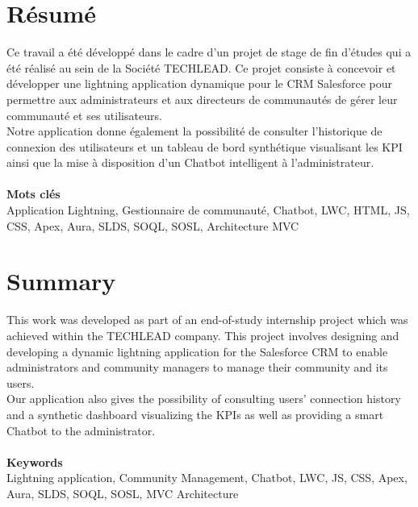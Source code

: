 
\chapter*{Résumé}
\thispagestyle{empty}
\begingroup
\centering


Ce travail a été développé dans le cadre d'un projet de stage de fin d'études qui a été réalisé au sein de la
Société TECHLEAD.
Ce projet consiste à concevoir et développer une lightning application dynamique pour le CRM Salesforce
pour permettre aux administrateurs et aux directeurs de communautés de gérer leur communauté et ses utilisateurs.\\
Notre application donne également
la possibilité de consulter l'historique de connexion des utilisateurs et un tableau de bord synthétique visualisant les KPI ainsi que la mise à disposition d'un Chatbot intelligent à l'administrateur.\\~\\
\textbf{Mots clés}\\
Application Lightning, Gestionnaire de communauté, Chatbot, LWC, HTML, JS, CSS, Apex, Aura, SLDS, SOQL, SOSL, 
Architecture MVC

\endgroup
\cleardoublepage%









\chapter*{Summary}
\thispagestyle{empty}
\begingroup
\centering

This work was developed as part of an end-of-study internship project which was achieved within the
TECHLEAD company.
This project involves designing and developing a dynamic lightning application for the Salesforce CRM
to enable administrators and community managers to manage their community and its users.\\
Our application also gives
the possibility of consulting users' connection history and a synthetic dashboard visualizing the KPIs as well as providing a smart Chatbot to the administrator.\\~\\
\textbf{Keywords}\\
Lightning application, Community Management, Chatbot, LWC, JS, CSS, Apex, Aura, SLDS, SOQL, SOSL, 
MVC Architecture

\endgroup




